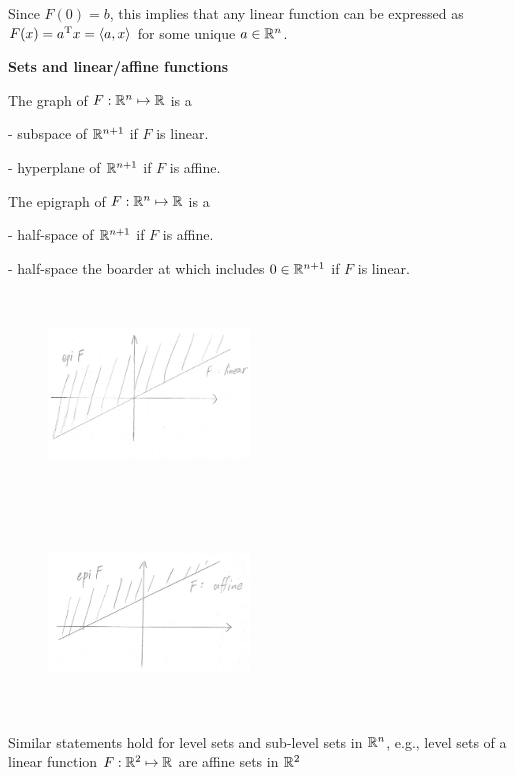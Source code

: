 Since $F(0)=b$, this implies that any linear function can be expressed as $F(x)=a^{{\rm T}} x=\langle a,x\rangle$ for some unique $a\in\mathbb{R}^{n}$.

\vspace{0.5cm}
\textbf{Sets and linear/affine functions}

The graph of $F:\mathbb{R}^{n}\mapsto\mathbb{R}$ is a 

\quad- subspace of $\mathbb{R}^{n+1}$ if $F$ is linear.

\quad- hyperplane of $\mathbb{R}^{n+1}$ if $F$ is affine.


The epigraph of $F:\mathbb{R}^{n}\mapsto\mathbb{R}$ is a 

\quad- half-space of $\mathbb{R}^{n+1}$ if $F$ is affine.

\quad- half-space the boarder at which includes $0\in\mathbb{R}^{n+1}$ if $F$ is linear.


\begin{figure}
	\centering
	\includegraphics[width=2.1in,height=2.1in]{figures/ch02/p50-1.jpg}
\end{figure}

\begin{figure}
	\centering
	\includegraphics[width=2.1in,height=2.1in]{figures/ch02/p50-2.jpg}
\end{figure}

Similar statements hold for level sets and sub-level sets in $\mathbb{R}^{n}$, e.g., level sets of a linear function $F:\mathbb{R}^{2}\mapsto\mathbb{R}$ are affine sets in $\mathbb{R}^{2}$

